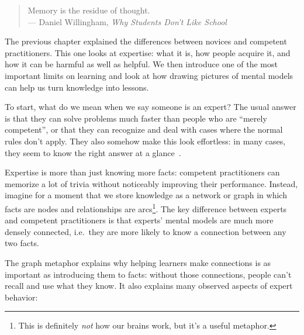 
\begin{quote}

  Memory is the residue of thought. \\
  --- Daniel Willingham, \emph{Why Students Don't Like School}

\end{quote}

The previous chapter explained the differences between novices and competent practitioners.
This one looks at expertise:
what it is,
how people acquire it,
and how it can be harmful as well as helpful.
We then introduce one of the most important limits on learning
and look at how drawing pictures of mental models can help us turn knowledge into lessons.

To start,
what do we mean when we say someone is an expert?
The usual answer is that they can solve problems much faster than people who are ``merely competent'',
or that they can recognize and deal with cases where the normal rules don't apply.
They also somehow make this look effortless:
in many cases,
they seem to know the right answer at a glance~\cite{Parn2017}.

Expertise is more than just knowing more facts:
competent practitioners can memorize a lot of trivia without noticeably improving their performance.
Instead,
imagine for a moment that we store knowledge as a network or graph
in which facts are nodes
and relationships are arcs\footnote{This is definitely \emph{not} how our brains work, but it's a useful metaphor.}.
The key difference between experts and competent practitioners is that
experts' mental models are much more densely connected,
i.e.\ they are more likely to know a connection between any two facts.

The graph metaphor explains why helping learners make connections
is as important as introducing them to facts:
without those connections,
people can't recall and use what they know.
It also explains many observed aspects of expert behavior:

